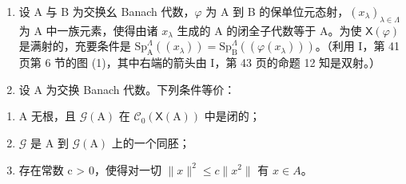 \begin{enumerate}
\def\labelenumi{\arabic{enumi})}
\setcounter{enumi}{14}
\item
  设 A 与 B 为交换幺 Banach 代数，\(\varphi\) 为 A 到 B 的保单位元态射，\((x_{\lambda})_{\lambda \in \Lambda}\) 为 A 中一族元素，使得由诸 \(x_{\lambda}\) 生成的 A 的闭全子代数等于 A。为使 \(\mathsf{X}(\varphi)\) 是满射的，充要条件是 \(\mathrm{Sp}_{\mathrm{A}}^{\Lambda}((x_{\lambda})) = \mathrm{Sp}_{\mathrm{B}}^{\Lambda}((\varphi (x_{\lambda})))\)。（利用 I，第 41 页第 6 节的图 (1)，其中右端的箭头由 I，第 43 页的命题 12 知是双射。）
\item
  设 A 为交换 Banach 代数。下列条件等价：
\end{enumerate}

\begin{enumerate}
\def\labelenumi{(\roman{enumi})}
\item
  A 无根，且 \(\mathcal{G}(\mathrm{A})\) 在 \(\mathcal{C}_0(\mathsf{X}(\mathrm{A}))\) 中是闭的；
\item
  \(\mathcal{G}\) 是 A 到 \(\mathcal{G}(\mathrm{A})\) 上的一个同胚；
\item
  存在常数 c \textgreater{} 0，使得对一切 \(\|x\|^{2} \leqslant c\|x^{2}\|\) 有 \(x \in A\)。
\end{enumerate}

